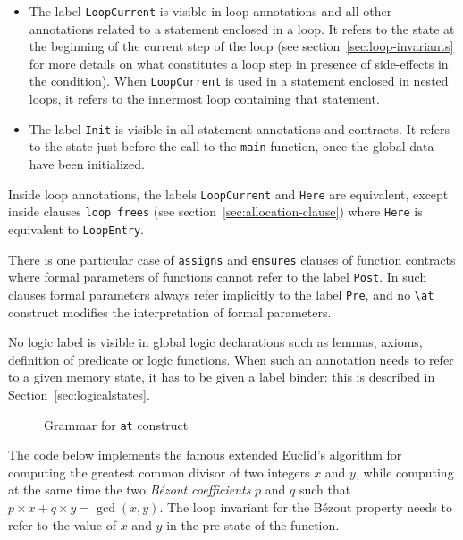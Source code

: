 \begin{itemize}
\item The label \lstinline|LoopCurrent|
is visible in loop annotations and
all other annotations related to a statement enclosed in a loop.
It refers to the state at the beginning of the current step of the loop (see
section~\ref{sec:loop-invariants} for more details on what constitutes a loop
step in presence of side-effects in the condition). When
\lstinline|LoopCurrent| is used in a statement enclosed in nested loops, it
refers to the innermost loop containing that statement.

\item The label \lstinline|Init| is visible in all statement annotations and 
contracts. It refers to the state just before the call to the \lstinline|main| 
function, once the global data have been initialized.
\end{itemize}

Inside loop annotations, the labels \lstinline|LoopCurrent| and 
\lstinline|Here| are equivalent,
except inside clauses \lstinline|loop frees|
(see section~\ref{sec:allocation-clause}) 
where \lstinline|Here| is equivalent to \lstinline|LoopEntry|.

There is one particular case of \lstinline|assigns| and \lstinline|ensures|
clauses of function contracts where formal parameters
of functions cannot refer to the label \lstinline|Post|.
In such clauses formal parameters always refer implicitly to the label
\lstinline|Pre|, and no \lstinline|\at| construct modifies the
interpretation of formal parameters.

No logic label is visible in global logic declarations
such as lemmas, axioms, definition of predicate or logic
functions. When such an annotation needs to refer to a given memory
state, it has to be given a label binder: this is described in
Section~\ref{sec:logicalstates}.

\begin{figure}[t]
  \begin{cadre}
    
  \end{cadre}
  \caption{Grammar for \lstinline|at| construct}
  \label{fig:gram:at}
\end{figure}


\begin{example}
  The code below implements the famous extended Euclid's algorithm
  for computing the greatest common divisor of two integers $x$ and
  $y$, while computing at the same time the two \emph{B\'ezout coefficients} $p$
  and $q$ such that $p\times x+q\times y = \gcd(x,y)$.
  The loop invariant for the B\'ezout property needs to refer to the
  value of $x$ and $y$ in the pre-state of the function.
\end{example}

